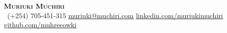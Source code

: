 \begin{center}
    \textbf{\Huge \scshape Muriuki Muchiri} \\ \vspace{1pt}
     \ \small (+254) 705-451-315 \quad
    \href{mailto:muriuki@muchiri.com}{ \underline{muriuki@muchiri.com}} \quad
    \href{https://www.linkedin.com/in/muriukimuchiri/}{ \underline{linkedin.com/muriukimuchiri}} \quad
    \href{https://github.com/muhreeowki}{ \underline{github.com/muhreeowki}}
\end{center}